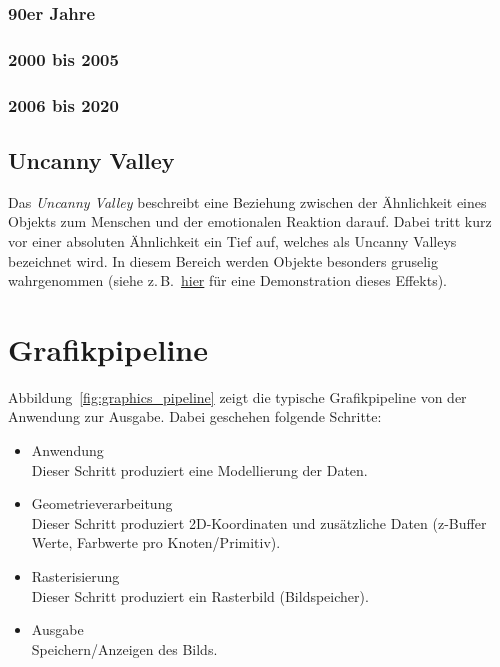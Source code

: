 \documentclass[a4paper, 11pt, accentcolor = tud3b]{tudreport}
\newcommand{\zB}{z.\,B.~}
\begin{document}
				\subsubsection{90er Jahre} %

				\subsubsection{2000 bis 2005} %

				\subsubsection{2006 bis 2020} %

			\subsection{Uncanny Valley}
				Das \emph{Uncanny Valley} beschreibt eine Beziehung zwischen der Ähnlichkeit eines Objekts zum Menschen und der emotionalen Reaktion darauf. Dabei tritt kurz vor einer absoluten Ähnlichkeit ein Tief auf, welches als Uncanny Valleys bezeichnet wird. In diesem Bereich werden Objekte besonders gruselig wahrgenommen (siehe \zB \href{fig:computer_graphics}{hier} für eine Demonstration dieses Effekts).

		\section{Grafikpipeline}
			Abbildung~\ref{fig:graphics_pipeline} zeigt die typische Grafikpipeline von der Anwendung zur Ausgabe. Dabei geschehen folgende Schritte:
			\begin{itemize}
				\item Anwendung \\ Dieser Schritt produziert eine Modellierung der Daten.
				\item Geometrieverarbeitung \\ Dieser Schritt produziert 2D-Koordinaten und zusätzliche Daten (z-Buffer Werte, Farbwerte pro Knoten/Primitiv).
				\item Rasterisierung \\ Dieser Schritt produziert ein Rasterbild (Bildspeicher).
				\item Ausgabe \\ Speichern/Anzeigen des Bilds.
			\end{itemize}
		
\end{document}
